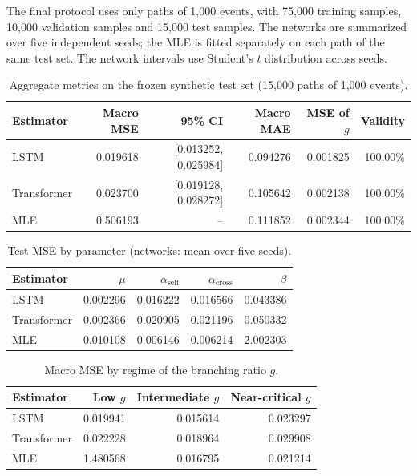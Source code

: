 The final protocol uses only paths of 1,000 events, with 75,000 training
samples, 10,000 validation samples and 15,000 test samples.
The networks are summarized over five independent seeds; the MLE is fitted
separately on each path of the same test set.
The network intervals use Student's $t$ distribution across seeds.

\begin{table}[htbp]
\centering
\caption{Aggregate metrics on the frozen synthetic test set (15,000 paths of 1,000 events).}
\label{tab:final-agregado}
\small
\begin{tabular}{lrrrrr}
\toprule
Estimator & Macro MSE & 95\% CI & Macro MAE & MSE of $g$ & Validity\\
\midrule
LSTM & 0.019618 & [0.013252, 0.025984] & 0.094276 & 0.001825 & 100.00\%\\
Transformer & 0.023700 & [0.019128, 0.028272] & 0.105642 & 0.002138 & 100.00\%\\
MLE & 0.506193 & -- & 0.111852 & 0.002344 & 100.00\%\\
\bottomrule
\end{tabular}
\end{table}

\begin{table}[htbp]
\centering
\caption{Test MSE by parameter (networks: mean over five seeds).}
\label{tab:final-parametros}
\begin{tabular}{lrrrr}
\toprule
Estimator & $\mu$ & $\alpha_{\mathrm{self}}$ & $\alpha_{\mathrm{cross}}$ & $\beta$\\
\midrule
LSTM & 0.002296 & 0.016222 & 0.016566 & 0.043386\\
Transformer & 0.002366 & 0.020905 & 0.021196 & 0.050332\\
MLE & 0.010108 & 0.006146 & 0.006214 & 2.002303\\
\bottomrule
\end{tabular}
\end{table}

\begin{table}[htbp]
\centering
\caption{Macro MSE by regime of the branching ratio $g$.}
\label{tab:final-regimes}
\begin{tabular}{lrrr}
\toprule
Estimator & Low $g$ & Intermediate $g$ & Near-critical $g$\\
\midrule
LSTM & 0.019941 & 0.015614 & 0.023297\\
Transformer & 0.022228 & 0.018964 & 0.029908\\
MLE & 1.480568 & 0.016795 & 0.021214\\
\bottomrule
\end{tabular}
\end{table}

